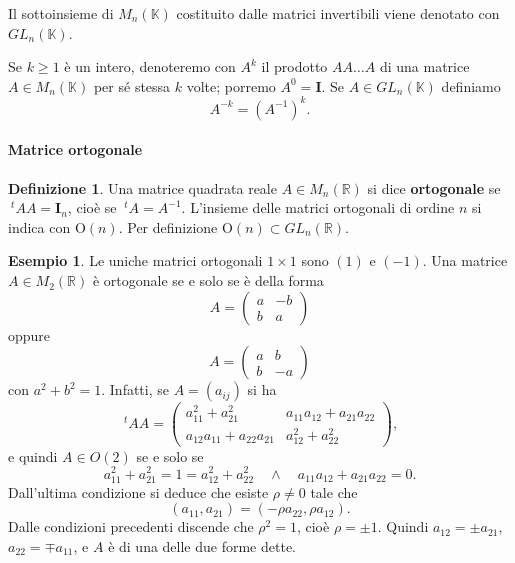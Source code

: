 \documentclass{article}
\theoremstyle{plain}
\theoremstyle{definition}
\newtheorem{defn}{Definizione}[section]
\newtheorem{exmp}{Esempio}[section]
\theoremstyle{remark}
\begin{document}
\vspace{10pt}

Il sottoinsieme di \( M_n(\mathbb{K}) \) costituito dalle matrici invertibili viene denotato con \( GL_n(\mathbb{K}) \).

\vspace{10pt}

Se \( k\geq 1 \) è un intero, denoteremo con \( A^k \) il prodotto \( AA \ldots A \) di una matrice \( A \in M_n(\mathbb{K}) \) per sé stessa \( k \) volte; 
porremo \( A^0 = \mathbf{I} \). Se \( A \in GL_n(\mathbb{K}) \) definiamo \[ A^{-k} = (A^{-1})^k. \]

\vspace{10pt}

\paragraph{Matrice ortogonale}
\begin{bxthm}
\begin{defn}
    Una matrice quadrata reale \( A \in M_n(\mathbb{R}) \) si dice \textbf{ortogonale} se \( \ ^{t}AA = \mathbf{I}_n \), cioè se \( \ ^{t}A = A^{-1} \). 
    L'insieme delle matrici ortogonali di ordine $n$ si indica con \( \mathrm{O}(n) \). Per definizione \( \mathrm{O}(n) \subset GL_n(\mathbb{R}) \).
\end{defn}
\end{bxthm}

\vspace{10pt}

\begin{exmp}
    Le uniche matrici ortogonali \( 1 \times 1 \) sono \( (1) \) e \( (-1) \). Una matrice \( A \in M_2(\mathbb{R}) \) è ortogonale se e solo se è della forma
\begin{equation}\label{duesei}
A = \begin{pmatrix}
a & -b \\
b & a
\end{pmatrix}    
\end{equation}
oppure
\begin{equation}\label{duesette}
A = \begin{pmatrix}
a & b \\
b & -a
\end{pmatrix}    
\end{equation}
con \( a^2 + b^2 = 1 \). 
Infatti, se \( A = (a_{ij}) \) si ha
\[
    \ ^{t}AA = \begin{pmatrix}
a_{11}^2 + a_{21}^2 & a_{11}a_{12} + a_{21}a_{22} \\
a_{12}a_{11} + a_{22}a_{21} & a_{12}^2 + a_{22}^2
\end{pmatrix},
\]
e quindi \( A \in O(2) \) se e solo se
\[
a_{11}^2 + a_{21}^2 = 1 = a_{12}^2 + a_{22}^2\quad\land\quad a_{11}a_{12} + a_{21}a_{22} = 0.
\]
Dall'ultima condizione si deduce che esiste \( \rho \neq 0 \) tale che
\[
(a_{11}, a_{21}) = (-\rho a_{22}, \rho a_{12}).
\]
Dalle condizioni precedenti discende che \( \rho^2 = 1 \), cioè \( \rho = \pm 1 \). Quindi \( a_{12} = \pm a_{21} \), \( a_{22} = \mp a_{11} \), e \( A \) è di una delle due forme dette.
\end{exmp}
\end{document}
